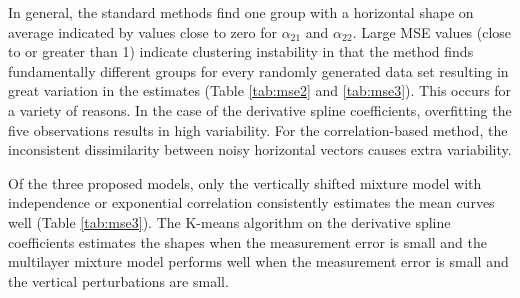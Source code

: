  In general, the standard methods find one group with a horizontal shape on average indicated by values close to zero for $\alpha_{21}$ and $\alpha_{22}$. Large MSE values (close to or greater than 1) indicate clustering instability in that the method finds fundamentally different groups for every randomly generated data set resulting in great variation in the estimates (Table \ref{tab:mse2} and \ref{tab:mse3}). This occurs for a variety of reasons. In the case of the derivative spline coefficients, overfitting the five observations results in high variability. For the correlation-based method, the inconsistent dissimilarity between noisy horizontal vectors causes extra variability.
  
 Of the three proposed models, only the vertically shifted mixture model with independence or exponential correlation consistently estimates the mean curves well (Table \ref{tab:mse3}). The K-means algorithm on the derivative spline coefficients estimates the shapes when the measurement error is small and the multilayer mixture model performs well when the measurement error is small and the vertical perturbations are small. 

